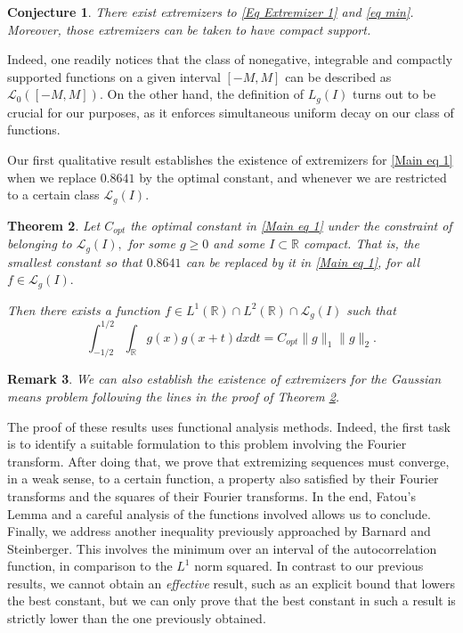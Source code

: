 \documentclass[11pt, reqno]{amsart}
\numberwithin{equation}{section}
\newtheorem{theorem}{Theorem}[section]
\newtheorem{remark}[theorem]{Remark}
\newtheorem{conjecture}[theorem]{Conjecture}
\newcommand{\R}{{\mathbb R}}
\begin{document}
\begin{conjecture}\label{Conj Compact} There exist extremizers to \eqref{Eq Extremizer 1} and \eqref{eq min}. Moreover, those extremizers can be taken to have compact support. 
\end{conjecture}

Indeed, one readily notices that the class of nonegative, integrable and compactly supported functions on a given interval $[-M,M]$ can be described as $\mathcal{L}_0([-M,M]).$ On the other hand, the definition of $L_g(I)$ turns out to be crucial for our purposes, as it enforces simultaneous uniform decay on our class of functions. 

Our first qualitative result establishes the existence of extremizers for \eqref{Main eq 1} when we replace $0.8641$ by the optimal constant, and whenever we are restricted to a certain class $\mathcal{L}_g(I).$ 

\begin{theorem}\label{Thm 2}
Let $C_{opt}$ the optimal constant in \eqref{Main eq 1} under the constraint of belonging to $\mathcal{L}_g(I),$ for some $g \ge 0$ and some $I \subset \R$ compact. That is, the smallest constant so that $0.8641$ can be replaced by it in \eqref{Main eq 1}, for all $f \in \mathcal{L}_g(I).$

Then there exists a function $f \in L^{1}(\R)\cap L^{2}(\R) \cap \mathcal{L}_g(I)$ such that
\begin{equation}\label{Eq Extremizer 1}
\int_{-1/2}^{1/2}\int_{\R}g(x)g(x+t)dxdt= C_{opt}\|g\|_1\|g\|_2.
\end{equation}
\end{theorem}

\begin{remark}
We can also establish the existence of extremizers for the Gaussian means problem following the lines in the proof of Theorem \ref{Thm 2}.
\end{remark}

The proof of these results uses functional analysis methods. Indeed, the first task is to identify a suitable formulation to this problem involving the Fourier transform. After doing that, we prove that extremizing sequences must converge, in a weak sense, to a certain function,
a property also satisfied by their Fourier transforms and the squares of their Fourier transforms. In the end, Fatou's Lemma and a careful analysis of the functions involved allows us to conclude. \\

Finally, we address another inequality previously approached by Barnard and Steinberger. This involves the minimum over an interval of the autocorrelation function, in comparison to the $L^1$ norm squared. In contrast
to our previous results, we cannot obtain an \emph{effective} result, such as an explicit bound that lowers the best constant, but we can only prove that the best constant in such a result is strictly lower than 
the one previously obtained. 
\end{document}
